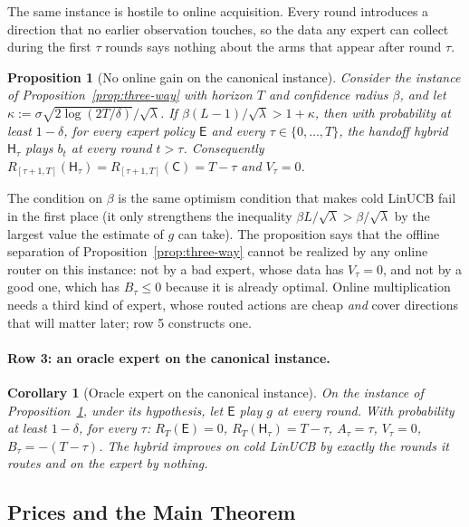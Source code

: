 \documentclass{article}
\newtheorem{proposition}{Proposition}
\newtheorem{corollary}{Corollary}
\theoremstyle{definition}
\theoremstyle{remark}
\theoremstyle{remark}
\newcommand{\Cold}{\mathsf{C}}
\newcommand{\Exp}{\mathsf{E}}
\newcommand{\Hyb}{\mathsf{H}}
\begin{document}
The same instance is hostile to online acquisition. Every round introduces a
direction that no earlier observation touches, so the data any expert can
collect during the first $\tau$ rounds says nothing about the arms that appear
after round $\tau$.

\begin{proposition}[No online gain on the canonical instance]
\label{prop:one-pass}
Consider the instance of Proposition~\ref{prop:three-way} with horizon $T$
and confidence radius $\beta$, and let $\kappa:=\sigma\sqrt{2\log(2T/\delta)}/\sqrt\lambda$.
If $\beta(L-1)/\sqrt\lambda>1+\kappa$, then with probability at least
$1-\delta$, for \emph{every} expert policy $\Exp$ and every $\tau\in\{0,\dots,T\}$,
the handoff hybrid $\Hyb_\tau$ plays $b_t$ at every round $t>\tau$. Consequently
$R_{[\tau+1,T]}(\Hyb_\tau)=R_{[\tau+1,T]}(\Cold)=T-\tau$ and $V_\tau=0$.
\end{proposition}

The condition on $\beta$ is the same optimism condition that makes cold LinUCB
fail in the first place (it only strengthens the inequality
$\beta L/\sqrt\lambda>\beta/\sqrt\lambda$ by the largest value the estimate of
$g$ can take). The proposition says that the offline separation of
Proposition~\ref{prop:three-way} cannot be realized by any online router on
this instance: not by a bad expert, whose data has $V_\tau=0$, and not by a
good one, which has $B_\tau\le0$ because it is already optimal. Online
multiplication needs a third kind of expert, whose routed actions are cheap
\emph{and} cover directions that will matter later; row 5 constructs one.


\paragraph{Row 3: an oracle expert on the canonical instance.}
\begin{corollary}[Oracle expert on the canonical instance]
\label{cor:cat-oracle}
On the instance of Proposition~\ref{prop:one-pass}, under its hypothesis, let
$\Exp$ play $g$ at every round. With probability at least $1-\delta$, for every
$\tau$: $R_T(\Exp)=0$, $R_T(\Hyb_\tau)=T-\tau$, $A_\tau=\tau$, $V_\tau=0$,
$B_\tau=-(T-\tau)$. The hybrid improves on cold LinUCB by exactly the rounds
it routes and on the expert by nothing.
\end{corollary}


\subsection{Prices and the Main Theorem}
\label{sec:price}
\end{document}
